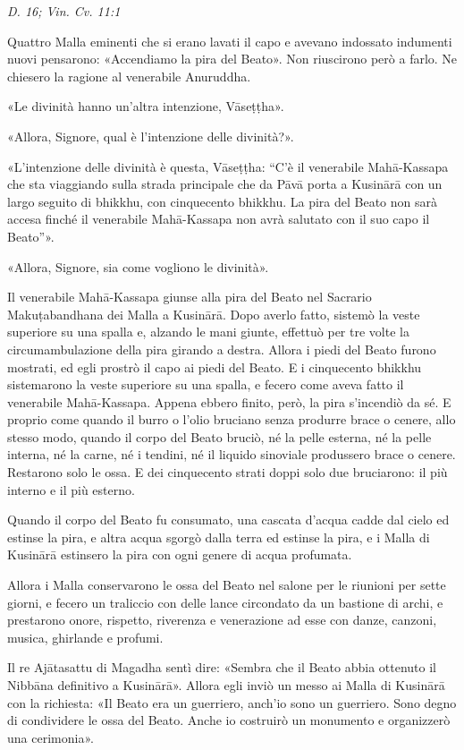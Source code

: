 \emph{D. 16; Vin. Cv. 11:1}


Quattro Malla eminenti che si erano lavati il capo e avevano indossato
indumenti nuovi pensarono: «Accendiamo la pira del Beato». Non
riuscirono però a farlo. Ne chiesero la ragione al venerabile Anuruddha.


«Le divinità hanno un’altra intenzione, Vāseṭṭha».


«Allora, Signore, qual è l’intenzione delle divinità?».


«L’intenzione delle divinità è questa, Vāseṭṭha: “C’è il venerabile
Mahā-Kassapa che sta viaggiando sulla strada principale che da Pāvā
porta a Kusinārā con un largo seguito di bhikkhu, con cinquecento
bhikkhu. La pira del Beato non sarà accesa finché il venerabile
Mahā-Kassapa non avrà salutato con il suo capo il Beato”».


«Allora, Signore, sia come vogliono le divinità».


Il venerabile Mahā-Kassapa giunse alla pira del Beato nel Sacrario
Makuṭabandhana dei Malla a Kusinārā. Dopo averlo fatto, sistemò la veste
superiore su una spalla e, alzando le mani giunte, effettuò per tre
volte la circumambulazione della pira girando a destra. Allora i piedi
del Beato furono mostrati, ed egli prostrò il capo ai piedi del Beato. E
i cinquecento bhikkhu sistemarono la veste superiore su una spalla, e
fecero come aveva fatto il venerabile Mahā-Kassapa. Appena ebbero
finito, però, la pira s’incendiò da sé. E proprio come quando il burro o
l’olio bruciano senza produrre brace o cenere, allo stesso modo, quando
il corpo del Beato bruciò, né la pelle esterna, né la pelle interna, né
la carne, né i tendini, né il liquido sinoviale produssero brace o
cenere. Restarono solo le ossa. E dei cinquecento strati doppi solo due
bruciarono: il più interno e il più esterno.


Quando il corpo del Beato fu consumato, una cascata d’acqua cadde dal
cielo ed estinse la pira, e altra acqua sgorgò dalla terra ed estinse la
pira, e i Malla di Kusinārā estinsero la pira con ogni genere di acqua
profumata.


Allora i Malla conservarono le ossa del Beato nel salone per le riunioni
per sette giorni, e fecero un traliccio con delle lance circondato da un
bastione di archi, e prestarono onore, rispetto, riverenza e venerazione
ad esse con danze, canzoni, musica, ghirlande e profumi.


Il re Ajātasattu di Magadha sentì dire: «Sembra che il Beato abbia
ottenuto il Nibbāna definitivo a Kusinārā». Allora egli inviò un messo
ai Malla di Kusinārā con la richiesta: «Il Beato era un guerriero,
anch’io sono un guerriero. Sono degno di condividere le ossa del Beato.
Anche io costruirò un monumento e organizzerò una cerimonia».


